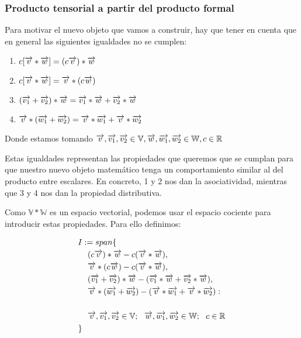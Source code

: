 \subsubsection{Producto tensorial a partir del producto formal} \label{sec:cociente_prod_formal}

Para motivar el nuevo objeto que vamos a construir, hay que tener en cuenta que en general las siguientes igualdades no se cumplen:

\begin{enumerate}
    \item $c [\overrightarrow{v} \ast \overrightarrow{w}] = (c\overrightarrow{v}) \ast \overrightarrow{w}$
    \item $c[\overrightarrow{v} \ast \overrightarrow{w}] = \overrightarrow{v} \ast (c\overrightarrow{w})$
    \item $(\overrightarrow{v_1} + \overrightarrow{v_2}) \ast \overrightarrow{w} = \overrightarrow{v_1} \ast \overrightarrow{w} + \overrightarrow{v_2} \ast \overrightarrow{w}$
    \item $\overrightarrow{v} \ast (\overrightarrow{w_1} + \overrightarrow{w_2}) = \overrightarrow{v} \ast \overrightarrow{w_1} + \overrightarrow{v} \ast \overrightarrow{w_2}$
\end{enumerate}

Donde estamos tomando $\overrightarrow{v}, \overrightarrow{v_1}, \overrightarrow{v_2} \in \mathbb{V}, \overrightarrow{w}, \overrightarrow{w_1}, \overrightarrow{w_2} \in \mathbb{W}, c \in \mathbb{R}$

Estas igualdades representan las propiedades que queremos que se cumplan para que nuestro nuevo objeto matemático tenga un comportamiento similar al del producto entre escalares. En concreto, 1 y 2 nos dan la asociatividad, mientras que 3 y 4 nos dan la propiedad distributiva.

Como $\mathbb{V} \ast \mathbb{W}$ es un espacio vectorial, podemos usar el espacio cociente para introducir estas propiedades. Para ello definimos:

\begin{equation}
\begin{split}
    I &:= span\{ \\
        & \ \  (c\overrightarrow{v}) \ast \overrightarrow{w} - c(\overrightarrow{v} \ast \overrightarrow{w}), \\
        & \ \  \overrightarrow{v} \ast (c\overrightarrow{w}) - c(\overrightarrow{v} \ast \overrightarrow{w}), \\
        & \ \  (\overrightarrow{v_1} + \overrightarrow{v_2}) \ast \overrightarrow{w} - (\overrightarrow{v_1} \ast \overrightarrow{w} + \overrightarrow{v_2} \ast \overrightarrow{w}), \\
        & \ \  \overrightarrow{v} \ast (\overrightarrow{w_1} + \overrightarrow{w_2}) - (\overrightarrow{v} \ast \overrightarrow{w_1} + \overrightarrow{v} \ast \overrightarrow{w_2}): \\
        & \ \  \\
        & \ \  \overrightarrow{v}, \overrightarrow{v_1}, \overrightarrow{v_2} \in \mathbb{V}; \ \  \overrightarrow{w}, \overrightarrow{w_1}, \overrightarrow{w_2} \in \mathbb{W}; \ \  c \in \mathbb{R} \\
     \} &
\end{split}
\end{equation}

